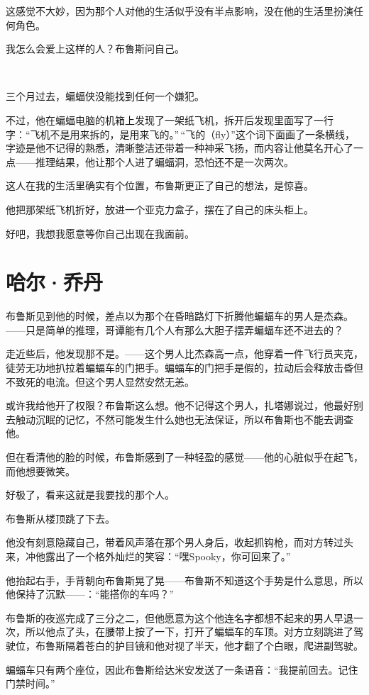 \documentclass[../main.tex]{subfiles}
\begin{document}
这感觉不大妙，因为那个人对他的生活似乎没有半点影响，没在他的生活里扮演任何角色。

我怎么会爱上这样的人？布鲁斯问自己。

~\

三个月过去，蝙蝠侠没能找到任何一个嫌犯。

不过，他在蝙蝠电脑的机箱上发现了一架纸飞机，拆开后发现里面写了一行字：“飞机不是用来拆的，是用来飞的。”\,“飞的（fly）”这个词下面画了一条横线，字迹是他不记得的熟悉，清晰整洁还带着一种神采飞扬，而内容让他莫名开心了一点——推理结果，他让那个人进了蝙蝠洞，恐怕还不是一次两次。

这人在我的生活里确实有个位置，布鲁斯更正了自己的想法，是惊喜。

他把那架纸飞机折好，放进一个亚克力盒子，摆在了自己的床头柜上。

好吧，我想我愿意等你自己出现在我面前。

\section{哈尔·乔丹}

布鲁斯见到他的时候，差点以为那个在昏暗路灯下折腾他蝙蝠车的男人是杰森。——只是简单的推理，哥谭能有几个人有那么大胆子摆弄蝙蝠车还不进去的？

走近些后，他发现那不是。——这个男人比杰森高一点，他穿着一件飞行员夹克，徒劳无功地扒拉着蝙蝠车的门把手。蝙蝠车的门把手是假的，拉动后会释放击昏但不致死的电流。但这个男人显然安然无恙。

或许我给他开了权限？布鲁斯这么想。他不记得这个男人，扎塔娜说过，他最好别去触动沉眠的记忆，不然可能发生什么她也无法保证，所以布鲁斯也不能去调查他。

但在看清他的脸的时候，布鲁斯感到了一种轻盈的感觉——他的心脏似乎在起飞，而他想要微笑。

好极了，看来这就是我要找的那个人。

布鲁斯从楼顶跳了下去。

他没有刻意隐藏自己，带着风声落在那个男人身后，收起抓钩枪，而对方转过头来，冲他露出了一个格外灿烂的笑容：“嘿Spooky，你可回来了。”

他抬起右手，手背朝向布鲁斯晃了晃——布鲁斯不知道这个手势是什么意思，所以他保持了沉默——：“能搭你的车吗？”

布鲁斯的夜巡完成了三分之二，但他愿意为这个他连名字都想不起来的男人早退一次，所以他点了头，在腰带上按了一下，打开了蝙蝠车的车顶。对方立刻跳进了驾驶位，布鲁斯隔着苍白的护目镜和他对视了半天，他才翻了个白眼，爬进副驾驶。

蝙蝠车只有两个座位，因此布鲁斯给达米安发送了一条语音：“我提前回去。记住门禁时间。”
\end{document}
